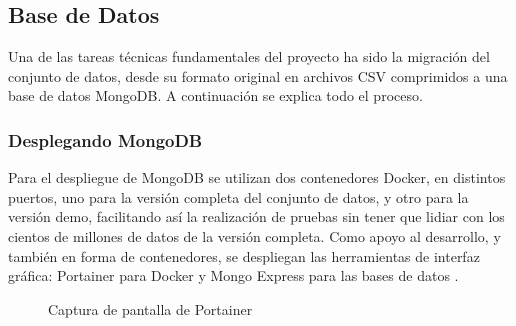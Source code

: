 \subsection{Base de Datos}


Una de las tareas técnicas fundamentales del proyecto ha sido la migración del conjunto de datos, desde su formato original en archivos CSV comprimidos a una base de datos MongoDB. A continuación se explica todo el proceso.


\subsubsection{Desplegando MongoDB}

Para el despliegue de MongoDB se utilizan dos contenedores Docker, en distintos puertos, uno para la versión completa del conjunto de datos, y otro para la versión demo, facilitando así la realización de pruebas sin tener que lidiar con los cientos de millones de datos de la versión completa. Como apoyo al desarrollo, y también en forma de contenedores, se despliegan las herramientas de interfaz gráfica: Portainer para Docker \cite{portainer_ce} y Mongo Express para las bases de datos \cite{mongo_express}. 


\begin{figure}[H]
  \centering
  \caption{Captura de pantalla de Portainer}
  \label{fig:screenshot3}
\end{figure}


